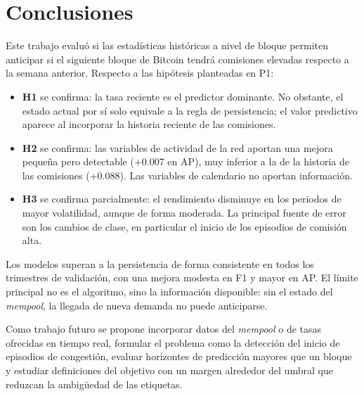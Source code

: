 \section{Conclusiones}
Este trabajo evaluó si las estadísticas históricas a nivel de bloque permiten anticipar si el siguiente bloque de Bitcoin tendrá comisiones elevadas respecto a la semana anterior. Respecto a las hipótesis planteadas en P1:

\begin{itemize}
\item \textbf{H1} se confirma: la tasa reciente es el predictor dominante. No obstante, el estado actual por sí solo equivale a la regla de persistencia; el valor predictivo aparece al incorporar la historia reciente de las comisiones.
\item \textbf{H2} se confirma: las variables de actividad de la red aportan una mejora pequeña pero detectable (+0.007 en AP), muy inferior a la de la historia de las comisiones (+0.088). Las variables de calendario no aportan información.
\item \textbf{H3} se confirma parcialmente: el rendimiento disminuye en los periodos de mayor volatilidad, aunque de forma moderada. La principal fuente de error son los cambios de clase, en particular el inicio de los episodios de comisión alta.
\end{itemize}

Los modelos superan a la persistencia de forma consistente en todos los trimestres de validación, con una mejora modesta en F1 y mayor en AP. El límite principal no es el algoritmo, sino la información disponible: sin el estado del \textit{mempool}, la llegada de nueva demanda no puede anticiparse.

Como trabajo futuro se propone incorporar datos del \textit{mempool} o de tasas ofrecidas en tiempo real, formular el problema como la detección del inicio de episodios de congestión, evaluar horizontes de predicción mayores que un bloque y estudiar definiciones del objetivo con un margen alrededor del umbral que reduzcan la ambigüedad de las etiquetas.
